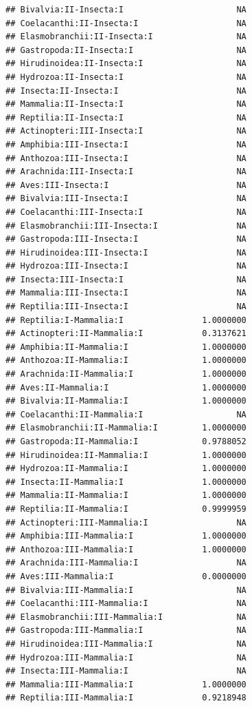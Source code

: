\documentclass[
  12pt,
]{article}
\begin{document}
\begin{verbatim}
## Bivalvia:II-Insecta:I                       NA
## Coelacanthi:II-Insecta:I                    NA
## Elasmobranchii:II-Insecta:I                 NA
## Gastropoda:II-Insecta:I                     NA
## Hirudinoidea:II-Insecta:I                   NA
## Hydrozoa:II-Insecta:I                       NA
## Insecta:II-Insecta:I                        NA
## Mammalia:II-Insecta:I                       NA
## Reptilia:II-Insecta:I                       NA
## Actinopteri:III-Insecta:I                   NA
## Amphibia:III-Insecta:I                      NA
## Anthozoa:III-Insecta:I                      NA
## Arachnida:III-Insecta:I                     NA
## Aves:III-Insecta:I                          NA
## Bivalvia:III-Insecta:I                      NA
## Coelacanthi:III-Insecta:I                   NA
## Elasmobranchii:III-Insecta:I                NA
## Gastropoda:III-Insecta:I                    NA
## Hirudinoidea:III-Insecta:I                  NA
## Hydrozoa:III-Insecta:I                      NA
## Insecta:III-Insecta:I                       NA
## Mammalia:III-Insecta:I                      NA
## Reptilia:III-Insecta:I                      NA
## Reptilia:I-Mammalia:I                1.0000000
## Actinopteri:II-Mammalia:I            0.3137621
## Amphibia:II-Mammalia:I               1.0000000
## Anthozoa:II-Mammalia:I               1.0000000
## Arachnida:II-Mammalia:I              1.0000000
## Aves:II-Mammalia:I                   1.0000000
## Bivalvia:II-Mammalia:I               1.0000000
## Coelacanthi:II-Mammalia:I                   NA
## Elasmobranchii:II-Mammalia:I         1.0000000
## Gastropoda:II-Mammalia:I             0.9788052
## Hirudinoidea:II-Mammalia:I           1.0000000
## Hydrozoa:II-Mammalia:I               1.0000000
## Insecta:II-Mammalia:I                1.0000000
## Mammalia:II-Mammalia:I               1.0000000
## Reptilia:II-Mammalia:I               0.9999959
## Actinopteri:III-Mammalia:I                  NA
## Amphibia:III-Mammalia:I              1.0000000
## Anthozoa:III-Mammalia:I              1.0000000
## Arachnida:III-Mammalia:I                    NA
## Aves:III-Mammalia:I                  0.0000000
## Bivalvia:III-Mammalia:I                     NA
## Coelacanthi:III-Mammalia:I                  NA
## Elasmobranchii:III-Mammalia:I               NA
## Gastropoda:III-Mammalia:I                   NA
## Hirudinoidea:III-Mammalia:I                 NA
## Hydrozoa:III-Mammalia:I                     NA
## Insecta:III-Mammalia:I                      NA
## Mammalia:III-Mammalia:I              1.0000000
## Reptilia:III-Mammalia:I              0.9218948

\end{verbatim}
\end{document}
